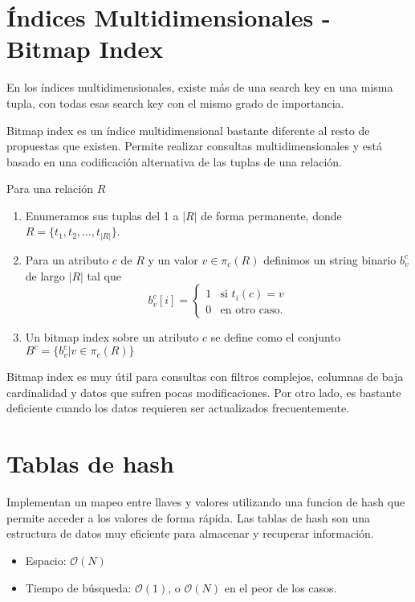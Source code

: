 \section{Índices Multidimensionales - Bitmap Index}
En los índices multidimensionales, existe más de una search key en una misma tupla, con todas esas search key con el mismo grado de importancia.

Bitmap index es un índice multidimensional bastante diferente al resto de propuestas que existen. Permite realizar consultas multidimensionales y está basado en una codificación alternativa de las tuplas de una relación.

Para una relación $R$
\begin{enumerate}
  \item Enumeramos sus tuplas del 1 a $|R|$ de forma permanente, donde $R = \{ t_1, t_2, \ldots, t_{|R|} \}$.
  \item Para un atributo $c$ de $R$ y un valor $v \in \pi_c(R)$ definimos un string binario $b_v^c$ de largo $|R|$ tal que
  \[ 
    b_v^c[i] = 
    \begin{cases} 
      1 & \text{si } t_i(c) = v\\
      0 & \text{en otro caso.}
    \end{cases}
  \]
  \item Un bitmap index sobre un atributo $c$ se define como el conjunto $B^c = \{ b_v^c | v \in \pi_c(R) \}$
\end{enumerate}

Bitmap index es muy útil para consultas con filtros complejos, columnas de baja cardinalidad y datos que sufren pocas modificaciones. Por otro lado, es bastante deficiente cuando los datos requieren ser actualizados frecuentemente.

\section{Tablas de hash}
Implementan un mapeo entre llaves y valores utilizando una funcion de hash que permite acceder a los valores de forma rápida. Las tablas de hash son una estructura de datos muy eficiente para almacenar y recuperar información.

\begin{itemize}
  \item Espacio: $\mathcal{O}(N)$
  \item Tiempo de búsqueda: $\mathcal{O}(1)$, o $\mathcal{O}(N)$ en el peor de los casos.
\end{itemize}

